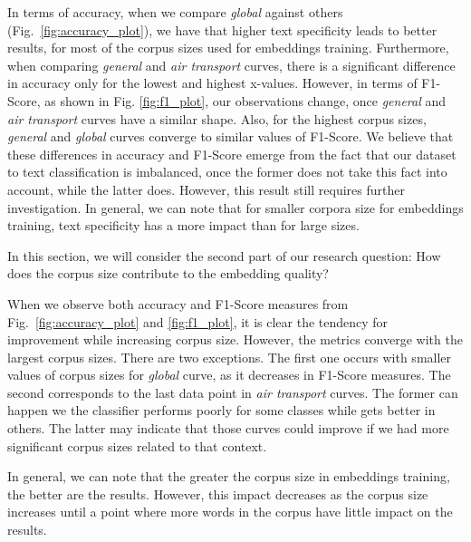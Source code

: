 In terms of accuracy, when we compare \emph{global} against others (Fig.~\ref{fig:accuracy_plot}), we have that higher text specificity leads to better results, for most of the corpus sizes used for embeddings training. Furthermore, when comparing \textit{general} and \textit{air transport} curves, there is a significant difference in accuracy only for the lowest and highest x-values. 
However, in terms of F1-Score, as shown in Fig. \ref{fig:f1_plot}, our observations change, once \textit{general} and \textit{air transport} curves have a similar shape. Also, for the highest corpus sizes, \textit{general} and \textit{global} curves converge to similar values of F1-Score. 
%
We believe that these differences in accuracy and F1-Score emerge from the fact that our dataset to text classification is imbalanced, once the former does not take this fact into account, while the latter does. However, this result still requires further investigation. 
In general, we can note that for smaller corpora size for embeddings training, text specificity has a more impact than for large sizes.



In this section, we will consider the second part of our research question: How does the corpus size contribute to the embedding quality?

When we observe both accuracy and F1-Score measures from Fig.~\ref{fig:accuracy_plot} and \ref{fig:f1_plot}, it is clear the tendency for improvement while increasing corpus size. However, the metrics converge with the largest corpus sizes. There are two exceptions. The first one occurs with smaller values of corpus sizes for \textit{global} curve, as it decreases in F1-Score measures. The second corresponds to the last data point in \textit{air transport} curves. The former can happen we the classifier performs poorly for some classes while gets better in others. The latter may indicate that those curves could improve if we had more significant corpus sizes related to that context.

In general, we can note that the greater the corpus size in embeddings training, the better are the results. However, this impact decreases as the corpus size increases until a point where more words in the corpus have little impact on the results. %
